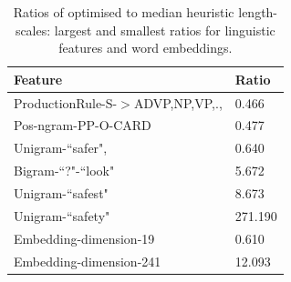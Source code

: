 \begin{table}
  \begin{tabularx}{\columnwidth}{l | X }
  Feature & Ratio\\
  \hline
  ProductionRule-S-$>$ADVP,NP,VP,., & 0.466 \nonumber\\
  Pos-ngram-PP-O-CARD & 0.477 \nonumber\\
  Unigram-``safer", & 0.640 \nonumber\\
  \hline
  Bigram-``?"-``look" & 5.672 \nonumber\\
  Unigram-``safest" & 8.673 \nonumber\\
  Unigram-``safety" & 271.190 \nonumber\\
  \hline
  Embedding-dimension-19 & 0.610 \nonumber\\
  \hline
  Embedding-dimension-241 & 12.093 \nonumber\\
  \end{tabularx}
  \caption{Ratios of optimised to median heuristic length-scales: largest and smallest
  ratios for linguistic features and word embeddings.}
  \label{tab:extreme_features}
\end{table}

